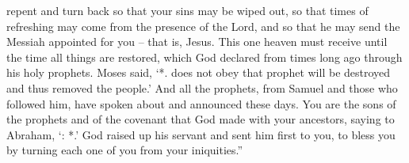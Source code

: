 {repent
and
turn back
so that
your
sins
may be wiped out,
so that times of refreshing may come from the presence of the Lord, and
so that he may send
the Messiah
appointed
for you
– that is, Jesus.
This one heaven
must
receive
until
the time
all
things are restored,
which God
declared
from
times long ago
through
his
holy
prophets.
Moses
said, ‘{}*.
{}
does
not
obey
that
prophet
will be destroyed and thus removed
{}
the people.’
And
all
the prophets,
from
Samuel
and
those who followed
him, have spoken
about and
announced
these
days.
You
are
the sons
of the prophets
and
of the covenant
that
God
made
with
your
ancestors,
saying
to
Abraham, ‘{}: *.’
God
raised up
his
servant
and sent
him
first
to you,
to bless
you
by
turning
each
one of you from
your
iniquities.”

}
